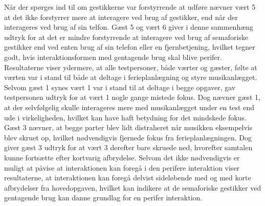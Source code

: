 Når der spørges ind til om gestikkerne var forstyrrende at udføre nævner vært 5 at det ikke forstyrrer mere at interagere ved brug af gestikker, end når der interageres ved brug af sin telfon. Gæst 5 og vært 6 giver i denne sammenhæng udtryk for at det er mindre forstyrrende at interagere ved brug af semaforiske gestikker end ved enten brug af sin telefon eller en fjernbetjening, hvilket tegner godt, hvis interaktionsformen med gentagende brug skal blive perifer. \blankline
%
Resultaterne viser ydermere, at alle testpersoner, både værter og gæster, følte at værten var i stand til både at deltage i ferieplanlægning og styre musikanlægget. Selvom gæst 1 synes vært 1 var i stand til at deltage i begge opgaver, gav testpersonen udtryk for at vært 1 nogle gange mistede fokus. Dog nævner gæst 1, at der selvfølgelig skulle interageres mere med musikanlægget under en test end ude i virkeligheden, hvilket kan have haft betydning for det mindskede fokus. Gæst 3 nævner, at begge parter blev lidt distraheret når musikken eksempelvis blev skruet op, hvilket nødvendigvis fjernede fokus fra ferieplanlægningen. Dog giver gæst 3 udtryk for at vært 3 derefter bare skruede ned, hvorefter samtalen kunne fortsætte efter kortvarig afbrydelse. \blankline
%
Selvom det ikke nødvendigvis er muligt at påvise at interaktionen kan foregå i den perifere interaktion viser resultaterne, at interaktionen kan foregå delvist sideløbende med og med korte afbrydelser fra hovedopgaven, hvilket kan indikere at de semaforiske gestikker ved gentagende brug kan danne grundlag for en perifer interaktion.


